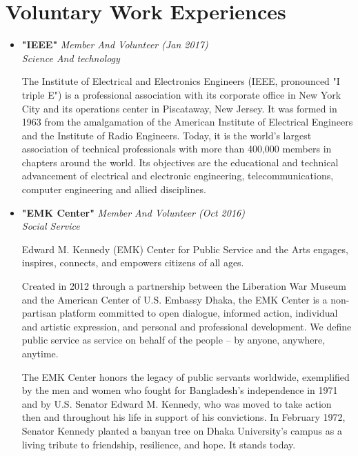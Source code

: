 \documentclass[11pt,a4paper,sans]{moderncv}        %
\begin{document}
\newpage

\section{Voluntary Work Experiences}

\vspace{6pt}

\begin{itemize}

\item{\textbf{"IEEE"} \textit{Member And Volunteer (Jan 2017) \\ Science And technology}

\vspace{3pt}

\small{The Institute of Electrical and Electronics Engineers (IEEE, pronounced "I triple E") is a professional association with its corporate office in New York City and its operations center in Piscataway, New Jersey.
It was formed in 1963 from the amalgamation of the American Institute of Electrical Engineers and the Institute of Radio Engineers.
Today, it is the world's largest association of technical professionals with more than 400,000 members in chapters around the world.
Its objectives are the educational and technical advancement of electrical and electronic engineering, telecommunications, computer engineering and allied disciplines.}}

\vspace{6pt}

\item{\textbf{"EMK Center"} \textit{Member And Volunteer (Oct 2016) \\ Social Service}

\vspace{3pt}

\small{Edward M. Kennedy (EMK) Center for Public Service and the Arts engages, inspires, connects, and empowers citizens of all ages.

Created in 2012 through a partnership between the Liberation War Museum and the American Center of U.S. Embassy Dhaka, the EMK Center is a non-partisan platform committed to open dialogue, informed action, individual and artistic expression, and personal and professional development. We define public service as service on behalf of the people – by anyone, anywhere, anytime.

The EMK Center honors the legacy of public servants worldwide, exemplified by the men and women who fought for Bangladesh’s independence in 1971 and by U.S. Senator Edward M. Kennedy, who was moved to take action then and throughout his life in support of his convictions. In February 1972, Senator Kennedy planted a banyan tree on Dhaka University’s campus as a living tribute to friendship, resilience, and hope. It stands today.}}


\end{itemize}
\end{document}

